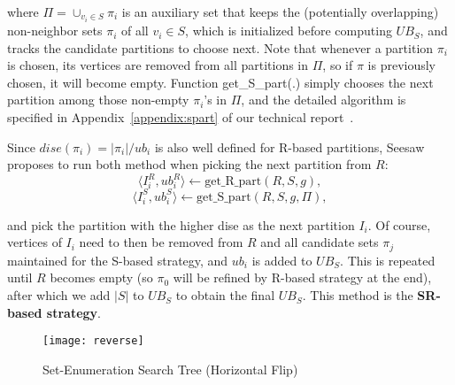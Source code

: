 \documentclass[sigconf, nonacm]{acmart}
\begin{document}
\noindent where $\Pi=\cup_{v_i\in S} \pi_i$ is an auxiliary set that keeps the (potentially overlapping) non-neighbor sets $\pi_i$ of all $v_i\in S$, which is initialized before computing $UB_S$, and tracks the candidate partitions to choose next. Note that whenever a partition $\pi_i$ is chosen, its vertices are removed from all partitions in $\Pi$, so if $\pi$ is previously chosen, it will become empty. Function get\_S\_part(.) simply chooses the next partition among those non-empty $\pi_i$'s in $\Pi$, and the detailed algorithm is specified in Appendix~\ref{appendix:spart} of our technical report~\cite{tech_report}.

\vspace{1mm}
 Since $dise(\pi_i)=|\pi_i|/ub_i$ is also well defined for R-based partitions, Seesaw~\cite{seesaw} proposes to run both method when picking the next partition from $R$:
\vspace{-1mm}
$$\langle I^R_i, ub^R_i\rangle\gets \text{get\_R\_part}(R, S, g),$$
\vspace{-5mm}
$$\langle I^S_i, ub^S_i\rangle\gets \text{get\_S\_part}(R, S, g, \Pi),$$
\vspace{-4mm}

\noindent and pick the partition with the higher dise as the next partition $I_i$. Of course, vertices of $I_i$ need to then be removed from $R$ and all candidate sets $\pi_j$ maintained for the S-based strategy, and $ub_i$ is added to $UB_S$. This is repeated until $R$ becomes empty (so $\pi_0$ will be refined by R-based strategy at the end), after which we add $|S|$ to $UB_S$ to obtain the final $UB_S$. This method is the {\bf SR-based strategy}.

\begin{figure}[t]
\vspace{-4mm}
  \texttt{[image: reverse]}
  \vspace{-2mm}
  \caption{Set-Enumeration Search Tree (Horizontal Flip)}\label{fig:reverse}
\end{figure}
\setlength{\textfloatsep}{0pt}

\vspace{-2mm}
\end{document}
